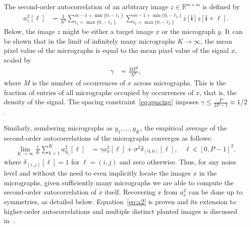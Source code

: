 \documentclass[english,11pt]{article}
\newcommand{\1}{\mathbf{1}}
\newcommand{\ii}{\textbf{i}}
\newcommand*\Bell{\ensuremath{\boldsymbol\ell}}
\numberwithin{equation}{section}
\theoremstyle{plain}
\theoremstyle{definition}
\theoremstyle{remark}
\theoremstyle{plain}
\theoremstyle{remark}
\theoremstyle{plain}
\theoremstyle{plain}
\begin{document}
The second-order autocorrelation of  an arbitrary image $z\in\mathbb{R}^{m\times m}$ is defined by
  \begin{align} 
 a_z^2[\Bell] & = \frac{1}{N^2} \sum_{i_1 = \max\{0, -\ell_1\}}^{m-1 + \min\{0, -\ell_1\}} \sum_{i_2 = \max\{0, -\ell_2\}}^{m-1 + \min\{0, -\ell_2\}}z[\ii]z[\ii+\Bell]. 
 \end{align}
 Below, the image $z$ might be either a target image $x$ or the micrograph $y$. 
 It can be shown that in the limit of infinitely many micrographs $K\to\infty$,  the mean pixel value of the micrographs is equal to the mean pixel value of the signal $x$, scaled by  
 \begin{align} \label{eq:gamma}
 \gamma & = \frac{M P^2}{N^2},
 \end{align}
 where $M$ is the number of occurrences of $x$ across micrographs. 
 This  is the fraction of entries of all micrographs occupied by occurrences of $x$, that is, the  density of the signal. 
  The spacing constraint~\eqref{eq:spacing} imposes $\gamma\leq\frac{P}{2P-1}\approx 1/2$.


 Similarly, numbering micrographs as $y_1, \ldots, y_K$, the empirical average of the second-order autocorrelations of the micrographs converges as follows:
 \begin{align} \label{eq:a2}
	\lim_{K \to \infty} \frac{1}{K} \sum_{k=1}^{K} a_{y_k}^2[\Bell] & = \gamma a_{x}^2[\Bell] + \sigma^2\delta_{(0,0)}[\Bell], \quad \Bell\in[0,P-1]^2,
 \end{align}
 where $\delta_{(i,j)}[\Bell]=1$ for $\Bell=(i,j)$ and zero otherwise.
 Thus, for any noise level and without the need to even implicitly locate the images $x$ in the micrographs, given sufficiently many micrographs we are able to compute the second-order autocorrelation of $x$ itself. Recovering $x$ from $a_x^2$ can be done up to symmetries, as detailed below.
 Equation~\eqref{eq:a2} is proven and its extension to higher-order autocorrelations and multiple distinct planted images is discussed in~\cite{bendory2018estimation}. 


\end{document}
